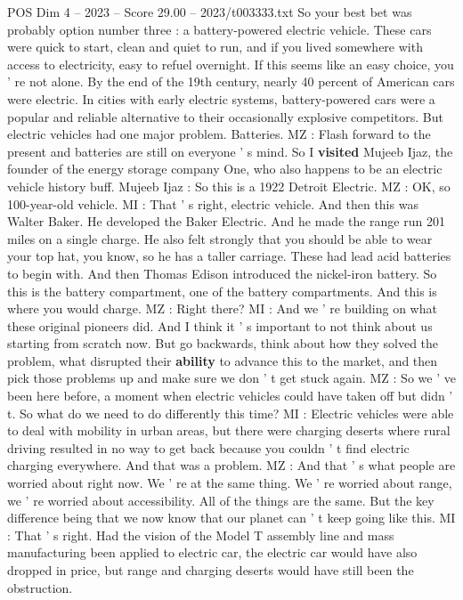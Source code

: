 \begin{textsample}{POS Dim 4 – 2023 – Score 29.00 – 2023/t003333.txt}
So your best bet was probably option number three : a battery-powered electric vehicle.
These cars were quick to start, clean and quiet to run, and if you lived somewhere with access to electricity, easy to refuel overnight.
If this seems like an easy choice, you ' re not alone.
By the end of the 19th century, nearly 40 percent of American cars were electric.
In cities with early electric systems, battery-powered cars were a popular and reliable alternative to their occasionally explosive competitors.
But electric vehicles had one major problem.
Batteries.
MZ : Flash forward to the present and batteries are still on everyone ' s mind.
So I \textbf{visited} Mujeeb Ijaz, the founder of the energy storage company One, who also happens to be an electric vehicle history buff.
Mujeeb Ijaz : So this is a 1922 Detroit Electric.
MZ : OK, so 100-year-old vehicle.
MI : That ' s right, electric vehicle.
And then this was Walter Baker.
He developed the Baker Electric.
And he made the range run 201 miles on a single charge.
He also felt strongly that you should be able to wear your top hat, you know, so he has a taller carriage.
These had lead acid batteries to begin with.
And then Thomas Edison introduced the nickel-iron battery.
So this is the battery compartment, one of the battery compartments.
And this is where you would charge.
MZ : Right there?
MI : And we ' re building on what these original pioneers did.
And I think it ' s important to not think about us starting from scratch now.
But go backwards, think about how they solved the problem, what disrupted their \textbf{ability} to advance this to the market, and then pick those problems up and make sure we don ' t get stuck again.
MZ : So we ' ve been here before, a moment when electric vehicles could have taken off but didn ' t.
So what do we need to do differently this time?
MI : Electric vehicles were able to deal with mobility in urban areas, but there were charging deserts where rural driving resulted in no way to get back because you couldn ' t find electric charging everywhere.
And that was a problem.
MZ : And that ' s what people are worried about right now.
We ' re at the same thing.
We ' re worried about range, we ' re worried about accessibility.
All of the things are the same.
But the key difference being that we now know that our planet can ' t keep going like this.
MI : That ' s right.
Had the vision of the Model T assembly line and mass manufacturing been applied to electric car, the electric car would have also dropped in price, but range and charging deserts would have still been the obstruction.

\end{textsample}
